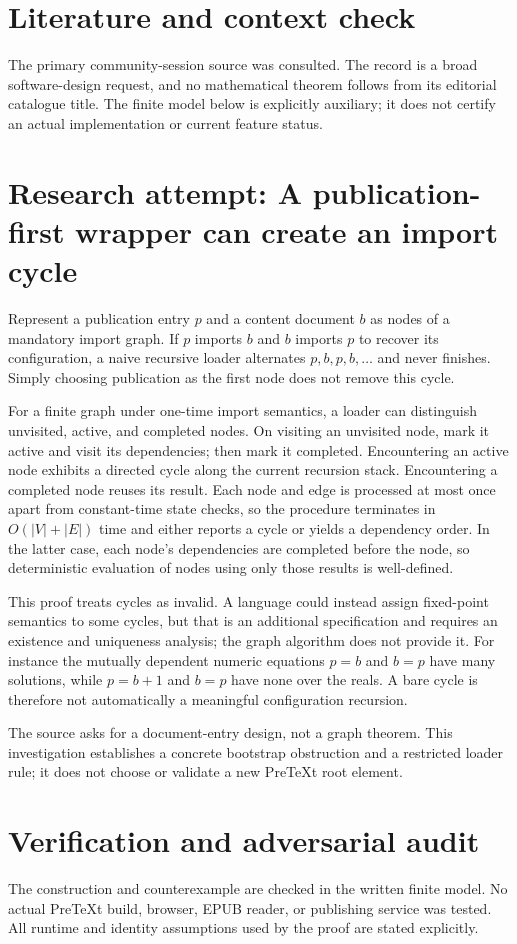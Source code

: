 \documentclass[11pt]{article}
\begin{document}
\section{Literature and context check}
The primary community-session source was consulted. The record is a broad software-design request, and no mathematical theorem follows from its editorial catalogue title. The finite model below is explicitly auxiliary; it does not certify an actual implementation or current feature status.
\section{Research attempt: A publication-first wrapper can create an import cycle}
Represent a publication entry $p$ and a content document $b$ as nodes of a mandatory import graph. If $p$ imports $b$ and $b$ imports $p$ to recover its configuration, a naive recursive loader alternates $p,b,p,b,\ldots$ and never finishes. Simply choosing publication as the first node does not remove this cycle.

For a finite graph under one-time import semantics, a loader can distinguish unvisited, active, and completed nodes. On visiting an unvisited node, mark it active and visit its dependencies; then mark it completed. Encountering an active node exhibits a directed cycle along the current recursion stack. Encountering a completed node reuses its result. Each node and edge is processed at most once apart from constant-time state checks, so the procedure terminates in $O(|V|+|E|)$ time and either reports a cycle or yields a dependency order. In the latter case, each node's dependencies are completed before the node, so deterministic evaluation of nodes using only those results is well-defined.

This proof treats cycles as invalid. A language could instead assign fixed-point semantics to some cycles, but that is an additional specification and requires an existence and uniqueness analysis; the graph algorithm does not provide it. For instance the mutually dependent numeric equations $p=b$ and $b=p$ have many solutions, while $p=b+1$ and $b=p$ have none over the reals. A bare cycle is therefore not automatically a meaningful configuration recursion.

The source asks for a document-entry design, not a graph theorem. This investigation establishes a concrete bootstrap obstruction and a restricted loader rule; it does not choose or validate a new PreTeXt root element.
\section{Verification and adversarial audit}
The construction and counterexample are checked in the written finite model. No actual PreTeXt build, browser, EPUB reader, or publishing service was tested. All runtime and identity assumptions used by the proof are stated explicitly.
\end{document}
